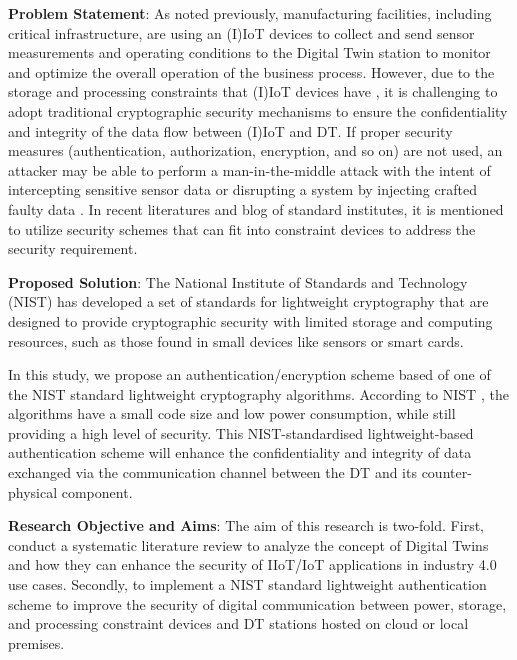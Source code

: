 \textbf{Problem Statement}:
As noted previously, manufacturing facilities, including critical infrastructure, are using an (I)IoT devices to collect and send sensor measurements and operating conditions to the Digital Twin station to monitor and optimize the overall operation of the business process. However, due to the storage and processing constraints that (I)IoT devices have \cite{williams_survey_2022,noauthor_lightweight_nodate}, it is challenging to adopt traditional cryptographic security mechanisms to ensure the confidentiality and integrity of the data flow between (I)IoT and DT. If proper security measures (authentication, authorization, encryption, and so on) are not used, an attacker may be able to perform a man-in-the-middle attack with the intent of intercepting sensitive sensor data or disrupting a system by injecting crafted faulty data \cite{salimBlockchainEnabledSecureDigital2022}. In recent literatures and blog of standard institutes, it is mentioned to utilize security schemes that can fit into constraint devices to address the security requirement.  

\textbf{Proposed Solution}:
The National Institute of Standards and Technology (NIST) has developed a set of standards for lightweight cryptography that are designed to provide cryptographic security with limited storage and computing resources, such as those found in small devices like sensors or smart cards.

In this study, we propose an authentication/encryption scheme based of one of the NIST standard lightweight cryptography algorithms. According to NIST \cite{noauthor_lightweight_nodate}, the algorithms have a small code size and low power consumption, while still providing a high level of security.  This NIST-standardised lightweight-based authentication scheme will enhance the confidentiality and integrity of data exchanged via the communication channel between the DT and its counter-physical component.


\textbf{Research Objective and Aims}:
The aim of this research is two-fold. First, conduct a systematic literature review to analyze the concept of Digital Twins and how they can enhance the security of IIoT/IoT applications in industry 4.0 use cases. Secondly, to implement a NIST standard lightweight authentication scheme to improve the security of digital communication between power, storage, and processing constraint devices and DT stations hosted on cloud or local premises.


